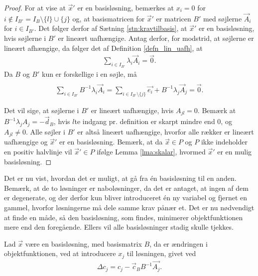 \begin{proof}
For at vise at $\vec{x}'$ er en basisløsning, bemærkes at $x_i = 0$ for $i \notin I_{B'} = I_B\setminus\{l\}\cup\{j\}$ og, at basismatricen for $\vec{x}'$ er matricen $B'$ med søjlerne $\vec{A}_i$ for $i \in I_{B'}$. 
Det følger derfor af Sætning \ref{stn:kravtilbasis},
at $\vec{x}'$ er en basisløsning, hvis søjlerne i $B'$ er lineært uafhængige.
Antag derfor, for modstrid, at søjlerne er lineært afhængige, da følger det af Definition \ref{defn_lin_uafh},
at
\begin{align*}
 \sum_{i \in I_{B'}} \lambda_i \vec{A}_i = \vec{0}.
\end{align*}
Da $B$ og $B'$ kun er forskellige i en søjle, må
\begin{align*}
 \\ \sum_{i \in I_{B'}}  B^{-1} \lambda_i \vec{A}_i  =\sum_{i \in I_{B'}\setminus \{j\}} \vec{e_i} + B^{-1} \lambda_j \vec{A}_j = \vec{0}.
\end{align*}

Det vil sige, at søjlerne i $B'$ er lineært uafhængige, hvis $A_{jl} = 0$.
Bemærk at $B^{-1} \lambda_j A_j = - \vec{d}_B$, hvis $l$te indgang pr. definition er skarpt mindre end $0$, og $A_{jl} \neq 0$.
Alle søjler i $B'$ er altså lineært uafhængige, hvorfor alle rækker er lineært uafhængige og $\vec{x}'$ er en basisløsning.
Bemærk, at da $\vec{x}\in P$ og $P$ ikke indeholder en positiv halvlinje vil $\vec{x}' \in P$ ifølge Lemma \ref{lma:skalar}, hvormed $\vec{x}'$ er en mulig basisløsning.
\end{proof}

Det er nu vist, hvordan det er muligt, at gå fra én basisløsning til en anden.
Bemærk, at de to løsninger er naboløsninger, da det er antaget, at ingen af dem er degenerate, og der derfor kun bliver introduceret én ny variabel og fjernet en gammel, hvorfor løsningerne må dele samme krav pånær et. 
Det er nu nødvendigt at finde en måde, så den basisløsning, som findes, minimerer objektfunktionen mere end den foregående. Ellers vil alle basisløsninger stadig skulle tjekkes. 

\begin{stn}
Lad $\vec{x}$ være en basisløsning, med basismatrix $B$, da er ændringen i objektfunktionen, ved at introducere $x_j$ til løsningen, givet ved
\begin{align*}
 \Delta c_j = c_j-\vec{c}_B B^{-1}\vec{A_j}.
\end{align*}
\label{stn:Deltac}
\end{stn}

